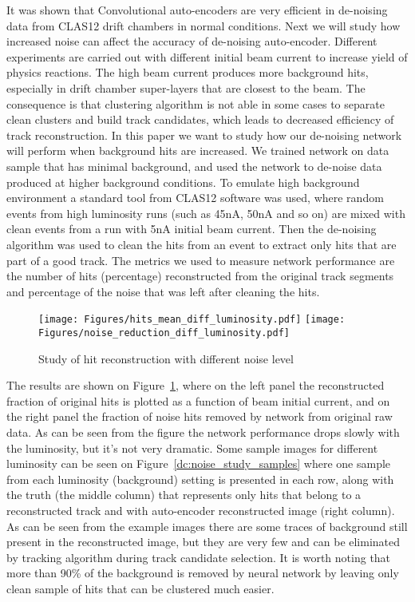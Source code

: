 \documentclass{article}
\begin{document}
It was shown that Convolutional auto-encoders are very efficient in de-noising data from CLAS12 drift chambers in normal conditions. Next we will study how increased noise can affect the accuracy of de-noising auto-encoder. Different experiments are carried out with different initial beam current to increase yield of physics reactions. The high beam current produces more background hits, especially in drift chamber super-layers that are closest to the beam. The consequence is that clustering algorithm is not able in some cases to separate clean clusters and build track candidates, which leads to decreased efficiency of track reconstruction. In this paper we want to study how our de-noising network will perform when background hits are increased. We trained network on data sample that has minimal background, and used the network to de-noise data produced at higher background conditions. To emulate high background environment a standard tool from CLAS12 software was used, where random events from high luminosity runs (such as 45nA, 50nA and so on) are mixed with clean events from a run with 5nA initial beam current. Then the de-noising algorithm was used to clean the hits from an event to extract only hits that are part of a good track. The metrics we used to measure network performance are the number of hits (percentage) reconstructed from the original track segments and percentage of the noise that was left after cleaning the hits.

\begin{figure}[!ht]
\begin{center}
 \texttt{[image: Figures/hits\_mean\_diff\_luminosity.pdf]}
 \texttt{[image: Figures/noise\_reduction\_diff\_luminosity.pdf]}
 \caption {Study of hit reconstruction with different noise level}
 \label{dc:noise_study_summary}
 \end{center}
\end{figure}

The results are shown on Figure~\ref{dc:noise_study_summary}, where on the left panel the reconstructed fraction of original hits is plotted as a function of beam initial current, and on the right panel the fraction of noise hits removed by network from original raw data. As can be seen from the figure the network performance drops slowly with the luminosity, but it's not very dramatic. Some sample images for different luminosity can be seen on Figure~\ref{dc:noise_study_samples} where one sample from each luminosity (background) setting is presented in each row, along with the truth (the middle column) that represents only hits that belong to a reconstructed track and with auto-encoder reconstructed image (right column).
As can be seen from the example images there are some traces of background still present in the reconstructed image, but they are very few and can be eliminated by tracking algorithm during track candidate selection. It is worth noting that more than 90\% of the background is removed by neural network by leaving only clean sample of hits that can be clustered much easier.
\end{document}
